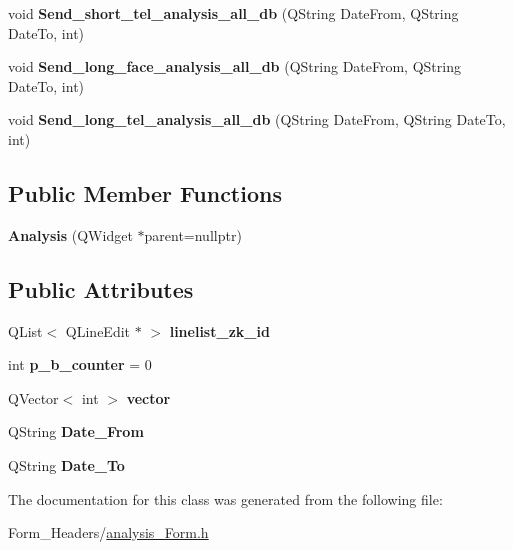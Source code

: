 \begin{DoxyCompactItemize}
void {\bfseries Send\+\_\+short\+\_\+tel\+\_\+analysis\+\_\+all\+\_\+db} (Q\+String Date\+From, Q\+String Date\+To, int)
\item 
\mbox{\label{class_analysis_a1971b405d0f22cd69bae7254d03a0096}} 
void {\bfseries Send\+\_\+long\+\_\+face\+\_\+analysis\+\_\+all\+\_\+db} (Q\+String Date\+From, Q\+String Date\+To, int)
\item 
\mbox{\label{class_analysis_a541e90e7f2f1e98f18bc99dac6a7935b}} 
void {\bfseries Send\+\_\+long\+\_\+tel\+\_\+analysis\+\_\+all\+\_\+db} (Q\+String Date\+From, Q\+String Date\+To, int)
\end{DoxyCompactItemize}
\subsection*{Public Member Functions}
\begin{DoxyCompactItemize}
\item 
\mbox{\label{class_analysis_aebf345002d43db3134d506ff5a7c5d4f}} 
{\bfseries Analysis} (Q\+Widget $\ast$parent=nullptr)
\end{DoxyCompactItemize}
\subsection*{Public Attributes}
\begin{DoxyCompactItemize}
\item 
\mbox{\label{class_analysis_a37d0c206278b9f2a1fe325ada2ccb6d7}} 
Q\+List$<$ Q\+Line\+Edit $\ast$ $>$ {\bfseries linelist\+\_\+zk\+\_\+id}
\item 
\mbox{\label{class_analysis_a6dff822f4f8cd0c1d379a086cd2774de}} 
int {\bfseries p\+\_\+b\+\_\+counter} = 0
\item 
\mbox{\label{class_analysis_ad81f8032d833754f635eb08492017c9a}} 
Q\+Vector$<$ int $>$ {\bfseries vector}
\item 
\mbox{\label{class_analysis_ac540cae4c40ffb59b2d6d2087da290db}} 
Q\+String {\bfseries Date\+\_\+\+From}
\item 
\mbox{\label{class_analysis_a918381b927ecb0559c094c0f4e95d037}} 
Q\+String {\bfseries Date\+\_\+\+To}
\end{DoxyCompactItemize}


The documentation for this class was generated from the following file\+:\begin{DoxyCompactItemize}
\item 
Form\+\_\+\+Headers/\mbox{\hyperlink{analysis___form_8h}{analysis\+\_\+\+Form.\+h}}\end{DoxyCompactItemize}
